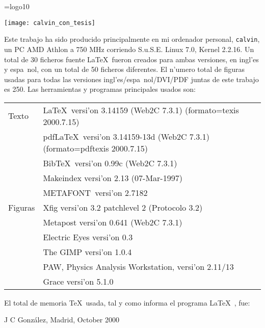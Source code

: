 
\thispagestyle{empty}
%
\mbox{}
%
\newpage
%
\thispagestyle{empty}
%
\mbox{}
%
\vfill
%
\scriptsize

\font\logo=logo10
\def\MF{\strut\hbox{\logo METAFONT}}\def\.#1{\strut\hbox{\tt #1}}

\begin{center}
  \texttt{[image: calvin\_con\_tesis]}
\end{center}

\vskip 2cm 

\noindent
Este trabajo ha sido producido principalmente en mi ordenador
personal, \texttt{calvin}, un PC AMD Athlon a 750 MHz corriendo
S.u.S.E.  Linux 7.0, Kernel 2.2.16. Un total de 30 ficheros fuente
\LaTeX\ fueron creados para ambas versiones, en ingl'es y espa~nol,
con un total de 50 ficheros diferentes. El n'umero total de figuras
usadas para todas las versiones ingl'es/espa~nol/DVI/PDF juntas de
este trabajo es 250. Las herramientas y
programas principales usados son:\\

\begin{tabular}{ll}

Texto
 & \LaTeX\ versi'on 3.14159 (Web2C 7.3.1) (formato=texis 2000.7.15)\\
 & pdf\LaTeX\ versi'on 3.14159-13d (Web2C 7.3.1) (formato=pdftexis 2000.7.15)\\
 & Bib\TeX\ versi'on 0.99c (Web2C 7.3.1)\\
 & Makeindex versi'on 2.13 (07-Mar-1997)\\
 & \MF\ versi'on 2.7182 \vspace{4pt}\\

Figuras
 & Xfig  versi'on 3.2 patchlevel 2 (Protocolo 3.2)\\
 & Metapost versi'on 0.641 (Web2C 7.3.1)\\
 & Electric Eyes versi'on 0.3\\
 & The GIMP versi'on 1.0.4\\
 & PAW, Physics Analysis Workstation, versi'on 2.11/13 \\
 & Grace versi'on 5.1.0\\

\end{tabular}

\vskip 20pt

\noindent
El total de memoria \TeX\ usada, tal y como informa el programa \LaTeX\ , fue:



\vskip 20pt

\raggedleft J C Gonz\'alez, Madrid, October 2000

\endinput
%
